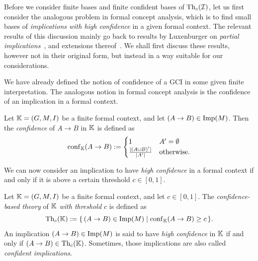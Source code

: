 Before we consider finite bases and finite confident bases of $\operatorname{Th}_c(\mathcal{I})$, let us
first consider the analogous problem in formal concept analysis, which is to find small
bases of \emph{implications with high confidence} in a given formal context.  The relevant
results of this discussion mainly go back to results by Luxenburger on \emph{partial
  implications}~\cite{diss:Luxenburger,Luxenburger91}, and extensions
thereof~\cite{DBLP:conf/ki/StummeTBPL01}.  We shall first discuss these results, however
not in their original form, but instead in a way suitable for our considerations.

We have already defined the notion of confidence of a GCI in some given finite
interpretation.  The analogous notion in formal concept analysis is the confidence of an
implication in a formal context.

\begin{Definition}
  \label{def:confidence-of-implications}
  Let ${\mathbb{K}} = (G, M, I)$ be a finite formal context, and let $(A \to B) \in \operatorname{Imp}(M)$.
  Then the \emph{confidence} of $A \to B$ in ${\mathbb{K}}$ is defined as
  \begin{equation*}
    \operatorname{conf}_{{\mathbb{K}}}(A \to B) :=
    \begin{cases}
      1 & A' = \emptyset \\
      \frac{ \lvert (A \cup B)' \rvert } { \lvert A' \rvert } & \text{otherwise}.
    \end{cases}
  \end{equation*}
\end{Definition}

We can now consider an implication to have \emph{high confidence} in a formal context if
and only if it is above a certain threshold $c \in [0,1]$.

\begin{Definition}
  \label{def:theory-with-threshold-for-formal-contexts}
  Let ${\mathbb{K}} = (G, M, I)$ be a finite formal context, and let $c \in [0,1]$.  The
  \emph{confidence-based theory} of ${\mathbb{K}}$ \emph{with threshold $c$} is defined as
  \begin{equation*}
    \operatorname{Th}_c({\mathbb{K}}) := {\{\, (A \to B) \in \operatorname{Imp}(M) \mid \operatorname{conf}_{{\mathbb{K}}}(A \to B) \ge c \,\}}.
  \end{equation*}
  An implication $(A \to B) \in \operatorname{Imp}(M)$ is said to have \emph{high confidence} in ${\mathbb{K}}$ if and only if $(A \to B) \in \operatorname{Th}_c({\mathbb{K}})$.  Sometimes, those implications are also
  called \emph{confident implications}.
\end{Definition}

